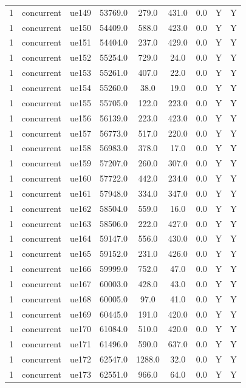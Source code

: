 \begin{table}[ht]
\begin{tabular}{|c|c|c|c|c|c|c|c|c|}
1 & concurrent & ue149 & 53769.0 & 279.0 & 431.0 & 0.0 & Y & Y \\
1 & concurrent & ue150 & 54409.0 & 588.0 & 423.0 & 0.0 & Y & Y \\
1 & concurrent & ue151 & 54404.0 & 237.0 & 429.0 & 0.0 & Y & Y \\
1 & concurrent & ue152 & 55254.0 & 729.0 & 24.0 & 0.0 & Y & Y \\
1 & concurrent & ue153 & 55261.0 & 407.0 & 22.0 & 0.0 & Y & Y \\
1 & concurrent & ue154 & 55260.0 & 38.0 & 19.0 & 0.0 & Y & Y \\
1 & concurrent & ue155 & 55705.0 & 122.0 & 223.0 & 0.0 & Y & Y \\
1 & concurrent & ue156 & 56139.0 & 223.0 & 423.0 & 0.0 & Y & Y \\
1 & concurrent & ue157 & 56773.0 & 517.0 & 220.0 & 0.0 & Y & Y \\
1 & concurrent & ue158 & 56983.0 & 378.0 & 17.0 & 0.0 & Y & Y \\
1 & concurrent & ue159 & 57207.0 & 260.0 & 307.0 & 0.0 & Y & Y \\
1 & concurrent & ue160 & 57722.0 & 442.0 & 234.0 & 0.0 & Y & Y \\
1 & concurrent & ue161 & 57948.0 & 334.0 & 347.0 & 0.0 & Y & Y \\
1 & concurrent & ue162 & 58504.0 & 559.0 & 16.0 & 0.0 & Y & Y \\
1 & concurrent & ue163 & 58506.0 & 222.0 & 427.0 & 0.0 & Y & Y \\
1 & concurrent & ue164 & 59147.0 & 556.0 & 430.0 & 0.0 & Y & Y \\
1 & concurrent & ue165 & 59152.0 & 231.0 & 426.0 & 0.0 & Y & Y \\
1 & concurrent & ue166 & 59999.0 & 752.0 & 47.0 & 0.0 & Y & Y \\
1 & concurrent & ue167 & 60003.0 & 428.0 & 43.0 & 0.0 & Y & Y \\
1 & concurrent & ue168 & 60005.0 & 97.0 & 41.0 & 0.0 & Y & Y \\
1 & concurrent & ue169 & 60445.0 & 191.0 & 420.0 & 0.0 & Y & Y \\
1 & concurrent & ue170 & 61084.0 & 510.0 & 420.0 & 0.0 & Y & Y \\
1 & concurrent & ue171 & 61496.0 & 590.0 & 637.0 & 0.0 & Y & Y \\
1 & concurrent & ue172 & 62547.0 & 1288.0 & 32.0 & 0.0 & Y & Y \\
1 & concurrent & ue173 & 62551.0 & 966.0 & 64.0 & 0.0 & Y & Y \\

\end{tabular}
\end{table}
